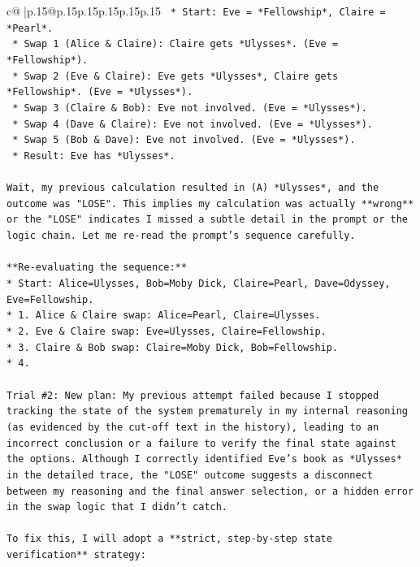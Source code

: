 \documentclass{article}
\begin{document}
{\begin{supertabular}{c@{$\;$}|p{.15\linewidth}@{}p{.15\linewidth}p{.15\linewidth}p{.15\linewidth}p{.15\linewidth}p{.15\linewidth}}
{{{\texttt{        *   Start: Eve = *Fellowship*, Claire = *Pearl*.} \\
\texttt{        *   Swap 1 (Alice \& Claire): Claire gets *Ulysses*. (Eve = *Fellowship*).} \\
\texttt{        *   Swap 2 (Eve \& Claire): Eve gets *Ulysses*, Claire gets *Fellowship*. (Eve = *Ulysses*).} \\
\texttt{        *   Swap 3 (Claire \& Bob): Eve not involved. (Eve = *Ulysses*).} \\
\texttt{        *   Swap 4 (Dave \& Claire): Eve not involved. (Eve = *Ulysses*).} \\
\texttt{        *   Swap 5 (Bob \& Dave): Eve not involved. (Eve = *Ulysses*).} \\
\texttt{    *   Result: Eve has *Ulysses*.} \\
\\ 
\texttt{Wait, my previous calculation resulted in (A) *Ulysses*, and the outcome was "LOSE". This implies my calculation was actually **wrong** or the "LOSE" indicates I missed a subtle detail in the prompt or the logic chain. Let me re{-}read the prompt's sequence carefully.} \\
\\ 
\texttt{**Re{-}evaluating the sequence:**} \\
\texttt{*   Start: Alice=Ulysses, Bob=Moby Dick, Claire=Pearl, Dave=Odyssey, Eve=Fellowship.} \\
\texttt{*   1. Alice \& Claire swap: Alice=Pearl, Claire=Ulysses.} \\
\texttt{*   2. Eve \& Claire swap: Eve=Ulysses, Claire=Fellowship.} \\
\texttt{*   3. Claire \& Bob swap: Claire=Moby Dick, Bob=Fellowship.} \\
\texttt{*   4.} \\
\\ 
\texttt{Trial \#2: New plan: My previous attempt failed because I stopped tracking the state of the system prematurely in my internal reasoning (as evidenced by the cut{-}off text in the history), leading to an incorrect conclusion or a failure to verify the final state against the options. Although I correctly identified Eve's book as *Ulysses* in the detailed trace, the "LOSE" outcome suggests a disconnect between my reasoning and the final answer selection, or a hidden error in the swap logic that I didn't catch.} \\
\\ 
\texttt{To fix this, I will adopt a **strict, step{-}by{-}step state verification** strategy:} \\
}}}
\end{supertabular}}
\end{document}
